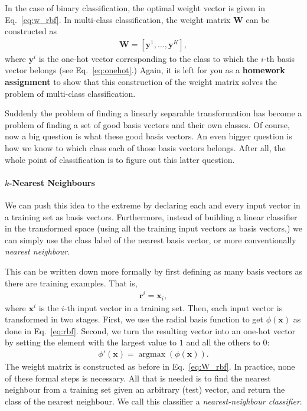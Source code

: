 \documentclass{report}
\newcommand{\vect}[1]{\mathbf{#1}}
\newcommand{\matr}[1]{\mathbf{#1}}
\newcommand{\vx}[0]{\vect{x}}
\newcommand{\vy}[0]{\vect{y}}
\newcommand{\vr}[0]{\vect{r}}
\newcommand{\mW}[0]{\matr{W}}
\DeclareMathOperator*{\argmax}{\arg \max}
\begin{document}
In the case of binary classification, the optimal weight vector is given in
Eq.~\eqref{eq:w_rbf}. In multi-class classification, the weight matrix $\mW$ can
be constructed as
\begin{align*}
    \mW = \left[
        \vy^1, \ldots, \vy^K
    \right],
\end{align*}
where $\vy^i$ is the one-hot vector corresponding to the class to which the
$i$-th basis vector belongs (see Eq.~\eqref{eq:onehot}.) Again, it is left for
you as a {\bf homework assignment} to show that this construction of the weight
matrix solves the problem of multi-class classification.

Suddenly the problem of finding a linearly separable transformation has become a
problem of finding a set of good basis vectors and their own classes. Of course,
now a big question is what these good basis vectors. An even bigger question is
how we know to which class each of those basis vectors belongs. After all, the
whole point of classification is to figure out this latter question.

\paragraph{$k$-Nearest Neighbours}

We can push this idea to the extreme by declaring each and every input vector in
a training set as basis vectors. Furthermore, instead of building a linear
classifier in the transformed space (using all the training input vectors as
basis vectors,) we can simply use the class label of the nearest basis vector,
or more conventionally {\it nearest neighbour}. 

This can be written down more formally by first defining as many basis vectors
as there are training examples. That is,
\begin{align*}
    \vr^i = \vx_i,
\end{align*}
where $\vx^i$ is the $i$-th input vector in a training set. Then, each input
vector is transformed in two stages. First, we use the radial basis function to
get $\phi(\vx)$ as done in Eq.~\eqref{eq:rbf}. Second, we turn the resulting
vector into an one-hot vector by setting the element with the largest value to
$1$ and all the others to $0$:
\begin{align*}
    \phi'(\vx) = \argmax(\phi(\vx)).
\end{align*}
The weight matrix is constructed as before in Eq.~\eqref{eq:W_rbf}.  In
practice, none of these formal steps is necessary. All that is needed is to find
the nearest neighbour from a training set given an arbitrary (test) vector, and
return the class of the nearest neighbour. We call this classifier a {\it
nearest-neighbour classifier}.
\end{document}
